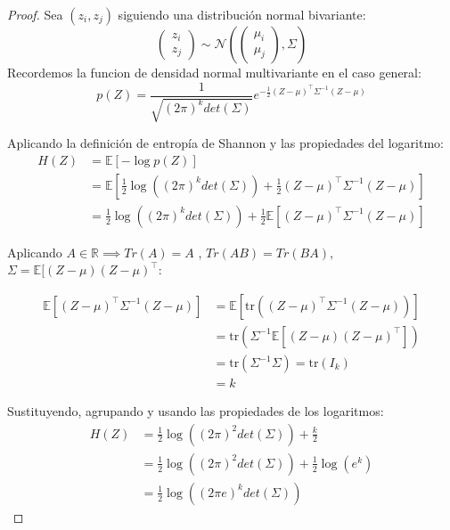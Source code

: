 \begin{proof}
Sea $(z_i, z_j)$ siguiendo una distribución normal bivariante:
\begin{equation}
\begin{pmatrix} z_i \\ z_j \end{pmatrix} \sim \mathcal{N}\left( \begin{pmatrix} \mu_i \\ \mu_j \end{pmatrix}, \Sigma \right)
\end{equation}
Recordemos la funcion de densidad normal multivariante en el caso general:
\begin{equation}
p(Z) = \frac{1}{\sqrt{(2\pi)^k det(\Sigma)}} e^{ -\frac{1}{2}(Z-\mu)^\top \Sigma^{-1} (Z-\mu) }
\end{equation}

Aplicando la definición de entropía de Shannon y las propiedades del logaritmo:
\begin{equation}
\begin{aligned}
H(Z) &= \mathbb{E}[-\log p(Z)] \\
     &= \mathbb{E}\left[ \frac{1}{2} \log((2\pi)^k det(\Sigma)) + \frac{1}{2}(Z-\mu)^\top \Sigma^{-1} (Z-\mu) \right] \\
     &= \frac{1}{2} \log((2\pi)^k det(\Sigma)) + \frac{1}{2}\mathbb{E}\left[(Z-\mu)^\top \Sigma^{-1} (Z-\mu) \right]
\end{aligned}
\end{equation}

Aplicando $A \in \mathbb{R} \implies Tr(A) = A $ , $Tr(AB) = Tr(BA)$, $\Sigma = \mathbb{E}[(Z-\mu)(Z-\mu)^\top$:

\begin{equation}
\begin{aligned}
 \mathbb{E}\left[(Z-\mu)^\top \Sigma^{-1} (Z-\mu) \right] &= \mathbb{E}[\text{tr}((Z-\mu)^\top\Sigma^{-1} (Z-\mu))] \\ &= \text{tr}(\Sigma^{-1} \mathbb{E}[(Z-\mu)(Z-\mu)^\top]) \\ 
 &= \text{tr}(\Sigma^{-1} \Sigma) = \text{tr}(I_k) \\ 
 &= k
\end{aligned}
\end{equation}

Sustituyendo, agrupando y usando las propiedades de los logaritmos:
\begin{equation}
\begin{aligned}
H(Z) &= \frac{1}{2} \log((2\pi)^2 det(\Sigma)) + \frac{k}{2} \\ 
     &= \frac{1}{2} \log((2\pi)^2 det(\Sigma)) + \frac{1}{2}\log(e^k) \\
     &= \frac{1}{2} \log \left( (2\pi e)^k det(\Sigma) \right)
\end{aligned}
\end{equation}


\end{proof}
